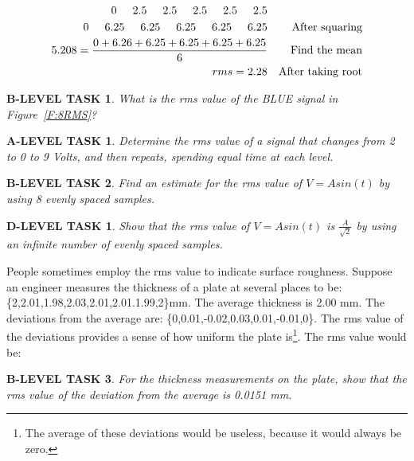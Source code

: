 \documentclass{book}
\numberwithin{equation}{section}
\newtheorem{alevel}{A-LEVEL TASK}
\newtheorem{blevel}{B-LEVEL TASK}
\newtheorem{dlevel}{D-LEVEL TASK}
\theoremstyle{definition}
\begin{document}
\begin{align*}
0 \hspace{.5cm}2.5 \hspace{.5cm} 2.5 \hspace{.5cm} 2.5 \hspace{.5cm} 2.5 \hspace{.5cm} 2.5\\
0 \hspace{.5cm}6.25 \hspace{.5cm}6.25 \hspace{.5cm}6.25\hspace{.5cm}6.25 \hspace{.5cm}6.25&&\text{After squaring}\\
5.208=\frac{0+6.26+6.25+6.25+6.25+6.25}{6}&&\text{Find the mean}\\
rms=2.28&&\text{After taking root}\\
\end{align*}

\begin{blevel}
What is the rms value of the BLUE signal in Figure~\ref{F:8RMS}?
\end{blevel}

\begin{alevel}
Determine the rms value of a signal that changes from 2 to 0 to 9 Volts, and then repeats, spending equal time at each level.
\end{alevel}

\begin{blevel}
Find an estimate for the rms value of $V = Asin(t)$ by using 8 evenly spaced samples.
\end{blevel}

\begin{dlevel}
Show that the rms value of $V = Asin(t)$ is $\frac{A}{\sqrt{2}}$ by using an infinite number of evenly spaced samples.
\end{dlevel}

\par
People sometimes employ the rms value to indicate surface roughness. Suppose an engineer measures the thickness of a plate at several places to be: \{2,2.01,1.98,2.03,2.01,2.01.1.99,2\}mm. The average thickness is 2.00 mm. The deviations from the average are: \{0,0.01,-0.02,0.03,0.01,-0.01,0\}. The rms value of the deviations provides a sense of how uniform the plate is\footnote{The average of these deviations would be useless, because it would always be zero.}. The rms value would be:

\begin{blevel}
For the thickness measurements on the plate, show that the rms value of the deviation from the average is 0.0151 mm.
\end{blevel}
\end{document}

